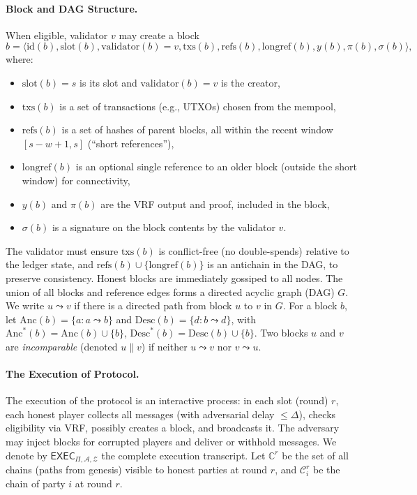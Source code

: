 \documentclass[11pt]{article}
\newcommand{\cZ}{\ensuremath{\mathscr{Z}}\xspace}
\newcommand{\cA}{\ensuremath{\mathscr{A}}\xspace}
\newcommand{\exec}{\ensuremath{\mathsf{EXEC}}\xspace}
\newcommand{\chain}{\ensuremath{\mathcal{C}}\xspace}
\newcommand{\chainset}{\ensuremath{\mathds{C}}\xspace}
\newcommand{\id}{\ensuremath{\mathrm{id}}\xspace}
\newcommand{\val}{\ensuremath{\mathrm{validator}}\xspace}
\newcommand{\slot}{\ensuremath{\mathrm{slot}}\xspace}
\newcommand{\txs}{\ensuremath{\mathrm{txs}}\xspace}
\newcommand{\refs}{\ensuremath{\mathrm{refs}}\xspace}
\newcommand{\longref}{\ensuremath{\mathrm{longref}}\xspace}
\newcommand{\Anc}{\ensuremath{\mathrm{Anc}}\xspace}
\newcommand{\Desc}{\ensuremath{\mathrm{Desc}}\xspace}
\begin{document}
\paragraph{Block and DAG Structure.} When eligible, validator $v$ may create a block
\begin{equation*}
b = \langle \id(b),\slot(b),\val(b)=v,\txs(b),\refs(b),\longref(b),y(b),\pi(b),\sigma(b)\rangle,
\end{equation*}
where:
\begin{itemize}
  \item $\slot(b)=s$ is its slot and $\val(b)=v$ is the creator,
  \item $\txs(b)$ is a set of transactions (e.g., UTXOs) chosen from the mempool,
  \item $\refs(b)$ is a set of hashes of parent blocks, all within the recent window $[s-w+1,s]$ (“short references”),
  \item $\longref(b)$ is an optional single reference to an older block (outside the short window) for connectivity,
  \item $y(b)$ and $\pi(b)$ are the VRF output and proof, included in the block,
  \item $\sigma(b)$ is a signature on the block contents by the validator $v$.
\end{itemize}
The validator must ensure $\txs(b)$ is conflict-free (no double-spends) relative to the ledger state, and $\refs(b)\cup\{\longref(b)\}$ is an antichain in the DAG, to preserve consistency. Honest blocks are immediately gossiped to all nodes. The union of all blocks and reference edges forms a directed acyclic graph (DAG) $G$. We write $u\leadsto v$ if there is a directed path from block $u$ to $v$ in $G$. For a block $b$, let $\Anc(b)=\{a: a\leadsto b\}$ and $\Desc(b)=\{d: b\leadsto d\}$, with $\Anc^*(b)=\Anc(b)\cup\{b\}$, $\Desc^*(b)=\Desc(b)\cup\{b\}$. Two blocks $u$ and $v$ are {\em incomparable} (denoted $u\parallel v$) if neither $u\leadsto v$ nor $v\leadsto u$.

\paragraph{The Execution of Protocol.} The execution of the protocol is an interactive process: in each slot (round) $r$, each honest player collects all messages (with adversarial delay $\le\Delta$), checks eligibility via VRF, possibly creates a block, and broadcasts it. The adversary may inject blocks for corrupted players and deliver or withhold messages. We denote by $\exec_{\Pi,\cA,\cZ}$ the complete execution transcript. Let $\chainset^r$ be the set of all chains (paths from genesis) visible to honest parties at round $r$, and $\chain_i^r$ be the chain of party $i$ at round $r$.
\end{document}
